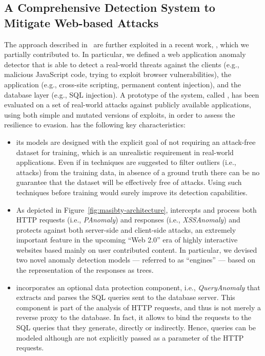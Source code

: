 \subsection{A Comprehensive Detection System to Mitigate Web-based
  Attacks}
\label{web:intro:masibty}
The approach described in~\citep{kruegel:jcn2005:webanomaly} are
further exploited in a recent work, \citep{masibty}, which we
partially contributed to. In particular, we defined a web application
anomaly detector that is able to detect a real-world threats against
the clients (e.g., malicious \textsf{JavaScript} code, trying to
exploit browser vulnerabilities), the application (e.g., cross-site
scripting, permanent content injection), and the database layer (e.g.,
SQL injection). A prototype of the system, called \masibty, has been
evaluated on a set of real-world attacks against publicly available
applications, using both simple and mutated versions of exploits, in
order to assess the resilience to evasion. \masibty has the following
key characteristics:

\begin{itemize}
\item its models are designed with the explicit goal of not requiring
  an attack-free dataset for training, which is an unrealistic
  requirement in real-world applications. Even if in
  \citep{10.1109/SP.2008.11} techniques are suggested to filter
  outliers (i.e., attacks) from the training data, in absence of a
  ground truth there can be no guarantee that the dataset will be
  effectively free of attacks. Using such techniques before training
  \masibty would surely improve its detection capabilities.

\item As depicted in Figure~\ref{fig:masibty-architecture}, \masibty
  intercepts and process both HTTP requests (i.e., \emph{PAnomaly})
  and responses (i.e., \emph{XSS\-Anomaly}) and protects against both
  server-side and client-side attacks, an extremely important feature
  in the upcoming ``Web 2.0'' era of highly interactive websites based
  mainly on user contributed content. In particular, we devised two
  novel anomaly detection models --- referred to as ``engines'' ---
  based on the representation of the responses as trees.

\item \masibty incorporates an optional data protection component,
  i.e., \emph{QueryAnomaly} that extracts and parses the SQL queries
  sent to the database server. This component is part of the analysis
  of HTTP requests, and thus is not merely a reverse proxy to the
  database. In fact, it allows to bind the requests to the SQL queries
  that they generate, directly or indirectly. Hence, queries can be
  modeled although are not explicitly passed as a parameter of the
  HTTP requests.
\end{itemize}

